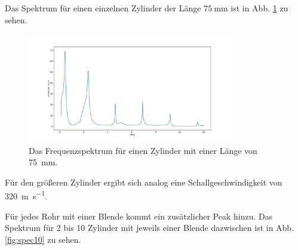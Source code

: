 Das Spektrum für einen einzelnen Zylinder der Länge $\SI{75}{\milli\metre}$ ist in Abb. \ref{fig:A3} zu sehen.
\begin{figure}
    \centering
    \includegraphics[width=0.8\textwidth]{plots/A_3.pdf}
    \caption{Das Frequenzspektrum für einen Zylinder mit einer Länge von \SI{75}{\milli\metre}.}
    \label{fig:A3}
\end{figure}

Für den größeren Zylinder ergibt sich analog eine Schallgeschwindigkeit von \SI{320}{\meter\per\second}.

Für jedes Rohr mit einer Blende kommt ein zusätzlicher Peak hinzu. 
Das Spektrum für \num{2} bis \num{10} Zylinder mit jeweils einer Blende dazwischen ist in Abb. \ref{fig:spec10} zu sehen. 

